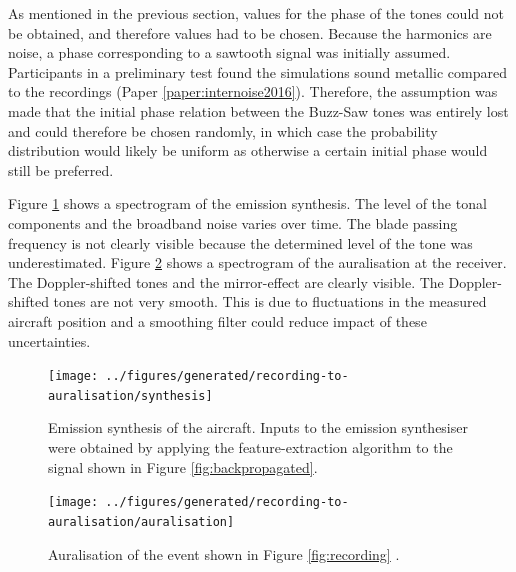 As mentioned in the previous section, values for the phase of the tones could
not be obtained, and therefore values had to be chosen. Because the harmonics
are  noise, a phase corresponding to a sawtooth signal was
initially assumed. Participants in a preliminary test found the simulations
sound metallic compared to the recordings (Paper \ref{paper:internoise2016}).
Therefore, the assumption was made that the initial phase relation between the
Buzz-Saw tones was entirely lost and could therefore be chosen randomly, in
which case the probability distribution would likely be uniform as otherwise a
certain initial phase would still be preferred.

Figure \ref{fig:synthesis} shows a spectrogram of the emission synthesis. The
level of the tonal components and the broadband noise varies over time. The
blade passing frequency is not clearly visible because the determined level of
the tone was underestimated. Figure \ref{fig:auralisation} shows a spectrogram
of the auralisation at the receiver. The Doppler-shifted tones and the
mirror-effect are clearly visible. The Doppler-shifted tones are not very
smooth. This is due to fluctuations in the measured aircraft position and a smoothing filter
could reduce impact of these uncertainties.

\newpage
\begin{figure}[H]
  \centering
  \texttt{[image: ../figures/generated/recording-to-auralisation/synthesis]}
  \caption{Emission synthesis of the aircraft. Inputs to the emission synthesiser were obtained by applying the feature-extraction algorithm to the signal shown in Figure \ref{fig:backpropagated}.}
  \label{fig:synthesis}
\end{figure}


\begin{figure}[H]
  \centering
  \texttt{[image: ../figures/generated/recording-to-auralisation/auralisation]}
  \caption{Auralisation of the event shown in Figure \ref{fig:recording} .
  }
  \label{fig:auralisation}
\end{figure}
